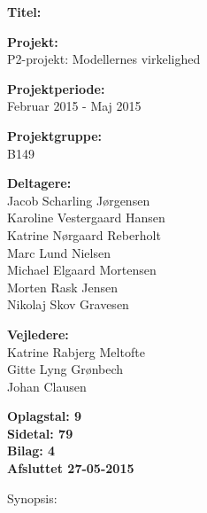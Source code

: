 \begin{minipage}[t]{0.48\textwidth}
\textbf{Titel:} \\[5pt]\bigskip\hspace{2ex}


\textbf{Projekt:} \\[5pt]\bigskip\hspace{2ex}
P2-projekt: Modellernes virkelighed

\textbf{Projektperiode:} \\[5pt]\bigskip\hspace{2ex}
Februar 2015 - Maj 2015

\textbf{Projektgruppe:} \\[5pt]\bigskip\hspace{2ex}
B149

\textbf{Deltagere:} \\[5pt]\hspace*{2ex}
Jacob Scharling Jørgensen \\\hspace*{2ex}
Karoline Vestergaard Hansen \\\hspace*{2ex}
Katrine Nørgaard Reberholt \\\hspace*{2ex}
Marc Lund Nielsen \\\hspace*{2ex}
Michael Elgaard Mortensen \\\hspace*{2ex}
Morten Rask Jensen \\\hspace*{2ex}
Nikolaj Skov Gravesen \\\bigskip\hspace{2ex}

\textbf{Vejledere:} \\[5pt]\hspace*{2ex}
Katrine Rabjerg Meltofte \\\hspace*{2ex}
Gitte Lyng Grønbech \\\hspace*{2ex}
Johan Clausen \\\bigskip\hspace{2ex}

\vspace*{0.5cm}

\textbf{Oplagstal: 9} \\
\textbf{Sidetal: 79} \\
\textbf{Bilag: 4} \\ 
\textbf{Afsluttet 27-05-2015}

\end{minipage}
\hfill
\begin{minipage}[t]{0.483\textwidth}
Synopsis: \\[5pt]
\fbox{\parbox{7cm}{\bigskip\bigskip}}
\end{minipage}

